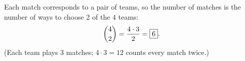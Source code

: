 Each match corresponds to a pair of teams, so the number of matches is the number of ways to choose $2$ of the $4$ teams:
\[
\dbinom42=\dfrac{4\cdot3}{2}=\boxed{6}.
\]
(Each team plays $3$ matches; $4\cdot3=12$ counts every match twice.)
